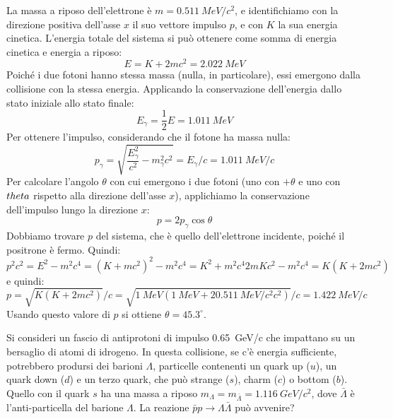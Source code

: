 \begin{Answer}
  La massa a riposo dell'elettrone \`e $m=\SI{0.511}{MeV/c^2}$, e identifichiamo con la direzione positiva dell'asse $x$
  il suo vettore impulso $p$, e con $K$ la sua energia cinetica. L'energia totale del sistema si pu\`o ottenere come
  somma di energia cinetica e energia a riposo:
    \begin{equation*}
      E = K + 2mc^2 = \SI{2.022}{MeV}
    \end{equation*}
    Poich\'e i due fotoni hanno stessa massa (nulla, in particolare),
    essi emergono dalla collisione con la stessa energia. Applicando
    la conservazione dell'energia dallo stato iniziale allo stato finale:
    \begin{equation*}
      E_\gamma = \frac{1}{2}E = \SI{1.011}{MeV}
    \end{equation*}
    Per ottenere l'impulso, considerando che il fotone ha massa nulla:
    \begin{equation*}
      p_\gamma = \sqrt{\frac{E_\gamma^2}{c^2}-m_\gamma^2c^2} = E_\gamma/c = \SI{1.011}{MeV/c}
    \end{equation*}
    Per calcolare l'angolo $\theta$ con cui emergono i due fotoni (uno
    con $+\theta$ e uno con $\-theta$ rispetto alla direzione
    dell'asse $x$), applichiamo la conservazione dell'impulso lungo la direzione $x$:
    \begin{equation*}
      p = 2p_\gamma\cos\theta
    \end{equation*}
    Dobbiamo trovare $p$ del sistema, che \`e quello dell'elettrone incidente, poich\'e il positrone \`e fermo. Quindi:
    \begin{equation*}
      p^2c^2 = E^2 - m^2c^4  = (K+mc^2)^2 - m^2c^4 = K^2 + m^2c^4 2mKc^2 - m^2c^4 =
      K(K+2mc^2)
    \end{equation*}
    e quindi:
    \begin{equation*}
    p = \sqrt{K(K+2mc^2)}/c = \sqrt{\SI{1}{MeV}(\SI{1}{MeV}+2\SI{0.511}{MeV/c^2}c^2)}/c = \SI{1.422}{MeV/c}
    \end{equation*}
    Usando questo valore di $p$ si ottiene $\theta=45.3^\circ$.
\end{Answer}

\begin{Exercise}[title={Sistema di riferimento del laboratorio e del centro di massa }]
  Si consideri un fascio di antiprotoni di impulso \SI{0.65}{GeV/c}
  che impattano su un bersaglio di atomi di idrogeno.  In questa
  collisione, se c'\`e energia sufficiente, potrebbero prodursi dei
  barioni $\Lambda$, particelle contenenti un quark up ($u$), un quark
  down ($d$) e un terzo quark, che pu\`o strange ($s$), charm ($c$) o
  bottom ($b$). Quello con il quark $s$ ha una massa a riposo
  $m_\Lambda=m_{\bar\Lambda}=\SI{1.116}{GeV/c^2}$, dove $\bar\Lambda$
  \`e l'anti-particella del barione $\Lambda$.
  \Question La reazione $\bar p p\to\Lambda\bar\Lambda$ pu\`o avvenire?
\end{Exercise}
  
